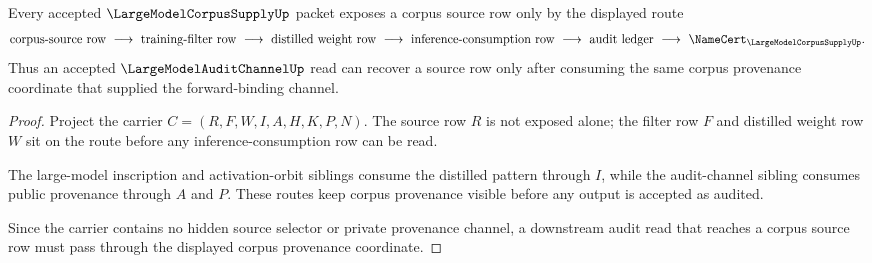 \begin{theorem}
\label{thm:large-model-corpus-supply-provenance-boundary}
Every accepted $\LargeModelCorpusSupplyUp$ packet exposes a corpus source row only by the displayed route
$$
\begin{gathered}
\text{corpus-source row}\ \longrightarrow\ \text{training-filter row}\ \longrightarrow\ \text{distilled weight row}\ \longrightarrow\ \text{inference-consumption row}\ \longrightarrow\ \text{audit ledger}\ \longrightarrow\ \NameCert_{\LargeModelCorpusSupplyUp}.
\end{gathered}
$$
Thus an accepted $\LargeModelAuditChannelUp$ read can recover a source row only after consuming the same corpus provenance coordinate that supplied the forward-binding channel.
\end{theorem}
\begin{proof}
Project the carrier $C=(R,F,W,I,A,H,K,P,N)$. The source row $R$ is not exposed alone; the filter row $F$ and distilled weight row $W$ sit on the route before any inference-consumption row can be read.

The large-model inscription and activation-orbit siblings consume the distilled pattern through $I$, while the audit-channel sibling consumes public provenance through $A$ and $P$. These routes keep corpus provenance visible before any output is accepted as audited.

Since the carrier contains no hidden source selector or private provenance channel, a downstream audit read that reaches a corpus source row must pass through the displayed corpus provenance coordinate.
\end{proof}




